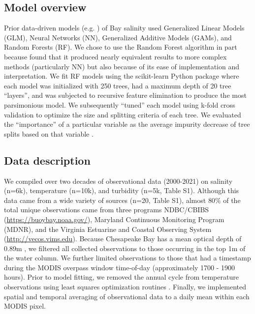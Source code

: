 \documentclass{article}
\begin{document}
\subsection{Model overview}

Prior data-driven models (e.g. \citet{urquhartGeospatialInterpolationMODISderived2013, vogelAssessingSatelliteSea2016}) of Bay salinity used Generalized Linear Models (GLM), Neural Networks (NN), Generalized Additive Models (GAMs), and Random Forests (RF). We chose to use the Random Forest algorithm in part because \citet{urquhartGeospatialInterpolationMODISderived2013} found that it produced nearly equivalent results to more complex methods (particularly NN) but also because of its ease of implementation and interpretation. We fit RF models using the scikit-learn Python package \citep{pedregosaScikitlearnMachineLearning2011} where each model was initialized with 250 trees, had a maximum depth of 20 tree “layers”, and was subjected to recursive feature elimination to produce the most parsimonious model. We subsequently “tuned” each model using k-fold cross validation to optimize the size and splitting criteria of each tree. We evaluated the “importance” of a particular variable as the average impurity decrease of tree splits based on that variable \citep{pedregosaScikitlearnMachineLearning2011}.

\subsection{Data description}

We compiled over two decades of observational data (2000-2021) on salinity (n=6k), temperature (n=10k), and turbidity (n=5k, Table S1). Although this data came from a wide variety of sources (n=20, Table S1), almost $80\%$ of the total unique observations came from three programs NDBC/CBIBS (\url{https://buoybay.noaa.gov/}), Maryland Continuous Monitoring Program (MDNR), and the Virginia Estuarine and Coastal Observing System (\url{http://vecos.vims.edu}). Because Chesapeake Bay has a mean optical depth of 0.89m \citep{urquhartRemotelySensedEstimates2012}, we filtered all collected observations to those occurring in the top 1m of the water column. We further limited observations to those that had a timestamp during the MODIS overpass window time-of-day (approximately 1700 - 1900 hours). Prior to model fitting, we removed the annual cycle from temperature observations using least squares optimization routines \citep{virtanenSciPyFundamentalAlgorithms2020a}. Finally, we implemented spatial and temporal averaging of observational data to a daily mean within each MODIS pixel. 
\end{document}

